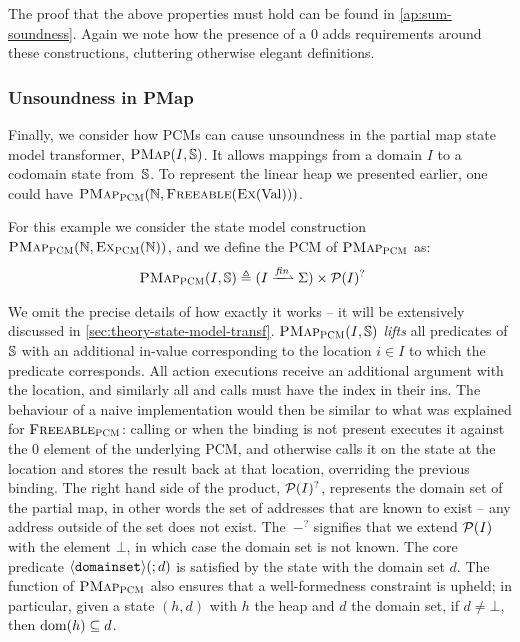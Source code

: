 The proof that the above properties must hold can be found in \cref{ap:sum-soundness}. Again we note how the presence of a $0$ adds requirements around these constructions, cluttering otherwise elegant definitions.

\subsubsection{Unsoundness in PMap}

Finally, we consider how PCMs can cause unsoundness in the partial map state model transformer, $\textsc{PMap}(I, \mathbb S)$. It allows mappings from a domain $I$ to a codomain state from~$\mathbb S$. To represent the linear heap we presented earlier, one could have $\textsc{PMap}_{\textsc{PCM}}(\mathbb N, \textsc{Freeable}(\textsc{Ex}(\text{Val})))$.

For this example we consider the state model construction $\textsc{PMap}_{\textsc{PCM}}(\mathbb N, \textsc{Ex}_{\textsc{PCM}}(\mathbb N))$, and we define the PCM of $\textsc{PMap}_{\textsc{PCM}}$ as: \begin{align*}
	\PMap_\PCM(I, \mmdl) &\defeq (I \finmap \St) \times \pset(I)^?
\end{align*}

We omit the precise details of how exactly it works -- it will be extensively discussed in \cref{sec:theory-state-model-transf}. $\textsc{PMap}_{\textsc{PCM}}(I,\mathbb S)$ \emph{lifts} all predicates of $\mathbb S$ with an additional in-value corresponding to the location $i\in I$ to which the predicate corresponds. All action executions receive an additional argument with the location, and similarly all \consume{} and \produce{} calls must have the index in their ins. The behaviour of a naive implementation would then be similar to what was explained for $\textsc{Freeable}_{\textsc{PCM}}$: calling \consume{} or \produce{} when the binding is not present executes it against the $0$ element of the underlying PCM, and otherwise calls it on the state at the location and stores the result back at that location, overriding the previous binding. The right hand side of the product, ${\cal P}(I)^?$, represents the domain set of the partial map, in other words the set of addresses that are known to exist -- any address outside of the set does not exist. The~$-^?$ signifies that we extend ${\cal P}(I)$ with the element $\bot$, in which case the domain set is not known. The core predicate $\left<\texttt{domainset}\right>\!(;d)$ is satisfied by the state with the domain set $d$. The \produce{} function of $\textsc{PMap}_{\textsc{PCM}}$ also ensures that a well-formedness constraint is upheld; in particular, given a state $(h,d)$ with $h$ the heap and $d$ the domain set, if $d\neq\bot$, then $\operatorname{dom}(h)\subseteq d$.

